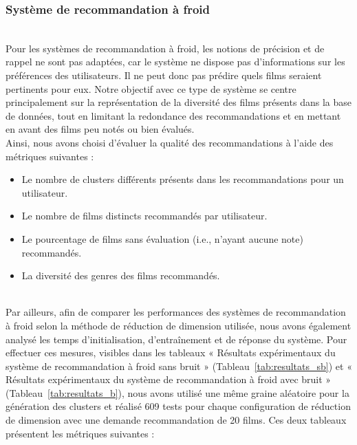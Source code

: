 \documentclass{article}
\begin{document}
\subsubsection{Système de recommandation à froid}
$ $\\
Pour les systèmes de recommandation à froid, les notions de précision et de rappel ne sont pas adaptées,
car le système ne dispose pas d'informations sur les préférences des utilisateurs. Il ne peut donc pas
prédire quels films seraient pertinents pour eux. Notre objectif avec ce type de système se centre principalement 
sur la représentation de la diversité des films présents dans la base de données, tout en limitant la
redondance des recommandations et en mettant en avant des films peu notés ou bien évalués.\\
Ainsi, nous avons choisi d'évaluer la qualité des recommandations à l'aide des métriques suivantes :\\
\begin{itemize}
    \item Le nombre de clusters différents présents dans les recommandations pour un utilisateur.
    \item Le nombre de films distincts recommandés par utilisateur.
    \item Le pourcentage de films sans évaluation (i.e., n'ayant aucune note) recommandés.
    \item La diversité des genres des films recommandés.
\end{itemize}
$ $\\
Par ailleurs, afin de comparer les performances des systèmes de recommandation à froid selon la méthode de
réduction de dimension utilisée, nous avons également analysé les temps d’initialisation, d’entraînement
et de réponse du système. Pour effectuer ces mesures, visibles dans les tableaux « Résultats expérimentaux
du système de recommandation à froid sans bruit » (Tableau~\ref{tab:resultats_sb}) et « Résultats expérimentaux
du système de recommandation à froid avec bruit » (Tableau~\ref{tab:resultats_b}), nous avons utilisé une même
graine aléatoire pour la génération des clusters et réalisé 609 tests pour chaque configuration de réduction de dimension avec une demande recommandation de 20 films.
Ces deux tableaux présentent les métriques suivantes :\\
\end{document}
